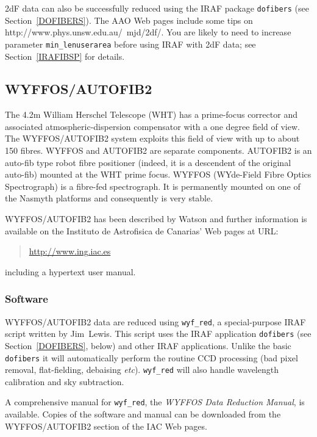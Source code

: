 \documentclass[twoside,11pt]{starlink}
\begin{document}
2dF data can also be successfully reduced using the IRAF package \texttt{dofibers} (see Section~\ref{DOFIBERS}).  The AAO Web pages include
some tips on 
{http://www.phys.unsw.edu.au/~mjd/2df/}.  You are likely to need to
increase parameter \texttt{min\_lenuserarea} before using IRAF with 2dF
data; see Section~\ref{IRAFIBSP} for details.

\subsection{\label{WYFFOS_I}WYFFOS/AUTOFIB2}

The 4.2m William Herschel Telescope (WHT) has a prime-focus corrector
and associated
\newline atmospheric-dispersion compensator with a one degree
field of view.  The WYFFOS/AUTOFIB2 system exploits this field of
view with up to about 150 fibres.  WYFFOS and AUTOFIB2 are separate
components.  AUTOFIB2 is an auto-fib type robot fibre positioner
(indeed, it is a descendent of the original auto-fib) mounted at the
WHT prime focus.  WYFFOS (WYde-Field Fibre Optics Spectrograph) is a
fibre-fed spectrograph.  It is permanently mounted on one of the Nasmyth
platforms and consequently is very stable.

WYFFOS/AUTOFIB2 has been described by Watson\cite{WATSON95} and
further information is available on the Instituto de Astrofisica de
Canarias' Web pages at URL:

\begin{quote}
\url{http://www.ing.iac.es}
\end{quote}

including a hypertext user manual.

\subsubsection{\label{WYFFOS_S}Software}

WYFFOS/AUTOFIB2 data are reduced using \texttt{wyf\_red}, a special-purpose
IRAF script written by Jim~Lewis.  This script uses the IRAF application
\texttt{dofibers} (see Section~\ref{DOFIBERS}, below) and other IRAF
applications.  Unlike the basic \texttt{dofibers} it will automatically
perform the routine CCD processing (bad pixel removal, flat-fielding,
debaising \emph{etc}).  \texttt{wyf\_red} will also handle wavelength calibration
and sky subtraction.

A comprehensive manual for \texttt{wyf\_red}, the \textit{WYFFOS Data
Reduction Manual}\/\cite{LEWIS96}, is available.  Copies of the software
and manual can be downloaded from the WYFFOS/AUTOFIB2 section of the
IAC Web pages.
\end{document}
